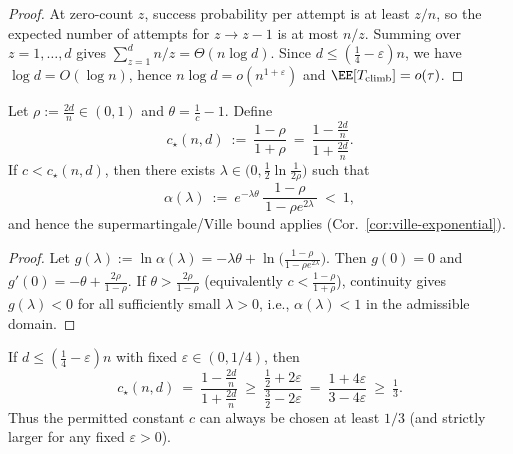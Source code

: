 \begin{proof}
	At zero-count $z$, success probability per attempt is at least $z/n$, so the expected number of attempts for $z\!\to\! z-1$ is at most $n/z$.
	Summing over $z=1,\dots,d$ gives $\sum_{z=1}^{d}n/z=\Theta(n\log d)$.
	Since $d\le(\tfrac14-\varepsilon)n$, we have $\log d=O(\log n)$, hence $n\log d=o(n^{1+\varepsilon})$ and $\EE[T_{\mathrm{climb}}]=o(\tau)$.
\end{proof}




\begin{lemma}\label{lem:c-threshold-instance}
	Let $\rho:=\tfrac{2d}{n}\in(0,1)$ and $\theta=\tfrac{1}{c}-1$. Define
	\[
	c_\star(n,d)\ :=\ \frac{1-\rho}{1+\rho}\ =\ \frac{1-\tfrac{2d}{n}}{1+\tfrac{2d}{n}}.
	\]
	If $c<c_\star(n,d)$, then there exists $\lambda\in\!\big(0,\tfrac12\ln\tfrac{1}{2\rho}\big)$ such that
	\[
	\alpha(\lambda)\ :=\ e^{-\lambda\theta}\,\frac{1-\rho}{\,1-\rho e^{2\lambda}\,}\ <\ 1,
	\]
	and hence the supermartingale/Ville bound applies (Cor.~\ref{cor:ville-exponential}).
\end{lemma}

\begin{proof}
	Let $g(\lambda):=\ln\alpha(\lambda)=-\lambda\theta+\ln\!\big(\tfrac{1-\rho}{1-\rho e^{2\lambda}}\big)$. 
	Then $g(0)=0$ and $g'(0)=-\theta+\tfrac{2\rho}{1-\rho}$. 
	If $\theta>\tfrac{2\rho}{1-\rho}$ (equivalently $c<\tfrac{1-\rho}{1+\rho}$), continuity gives $g(\lambda)<0$ for all sufficiently small $\lambda>0$, i.e., $\alpha(\lambda)<1$ in the admissible domain.
\end{proof}

\begin{corollary}\label{cor:c-floor}
	If $d\le (\tfrac14-\varepsilon)n$ with fixed $\varepsilon\in(0,1/4)$, then
	\[
	c_\star(n,d)\ =\ \frac{1-\tfrac{2d}{n}}{1+\tfrac{2d}{n}}
	\ \ge\  \frac{\tfrac12+2\varepsilon}{\tfrac32-2\varepsilon}
	\ =\ \frac{1+4\varepsilon}{3-4\varepsilon}\ \ge\ \tfrac13.
	\]
	Thus the permitted constant $c$ can always be chosen at least $1/3$ (and strictly larger for any fixed $\varepsilon>0$).
\end{corollary}


